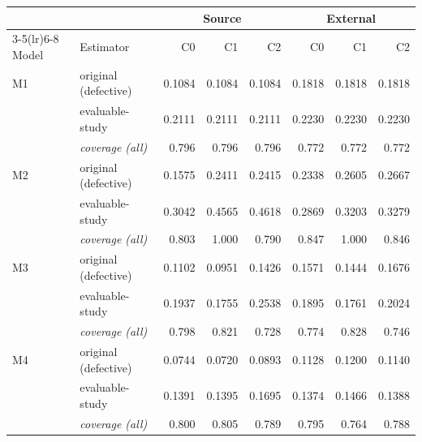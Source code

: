 \begin{tabular}{llrrrrrr}
\toprule
 & & \multicolumn{3}{c}{Source} & \multicolumn{3}{c}{External}\\
\cmidrule(lr){3-5}\cmidrule(lr){6-8}
Model & Estimator & C0 & C1 & C2 & C0 & C1 & C2\\
\midrule
M1 & original (defective) & 0.1084 & 0.1084 & 0.1084 & 0.1818 & 0.1818 & 0.1818\\
 & evaluable-study & 0.2111 & 0.2111 & 0.2111 & 0.2230 & 0.2230 & 0.2230\\
 & \emph{coverage (all)} & 0.796 & 0.796 & 0.796 & 0.772 & 0.772 & 0.772\\
\addlinespace
M2 & original (defective) & 0.1575 & 0.2411 & 0.2415 & 0.2338 & 0.2605 & 0.2667\\
 & evaluable-study & 0.3042 & 0.4565 & 0.4618 & 0.2869 & 0.3203 & 0.3279\\
 & \emph{coverage (all)} & 0.803 & 1.000 & 0.790 & 0.847 & 1.000 & 0.846\\
\addlinespace
M3 & original (defective) & 0.1102 & 0.0951 & 0.1426 & 0.1571 & 0.1444 & 0.1676\\
 & evaluable-study & 0.1937 & 0.1755 & 0.2538 & 0.1895 & 0.1761 & 0.2024\\
 & \emph{coverage (all)} & 0.798 & 0.821 & 0.728 & 0.774 & 0.828 & 0.746\\
\addlinespace
M4 & original (defective) & 0.0744 & 0.0720 & 0.0893 & 0.1128 & 0.1200 & 0.1140\\
 & evaluable-study & 0.1391 & 0.1395 & 0.1695 & 0.1374 & 0.1466 & 0.1388\\
 & \emph{coverage (all)} & 0.800 & 0.805 & 0.789 & 0.795 & 0.764 & 0.788\\
\bottomrule
\end{tabular}
